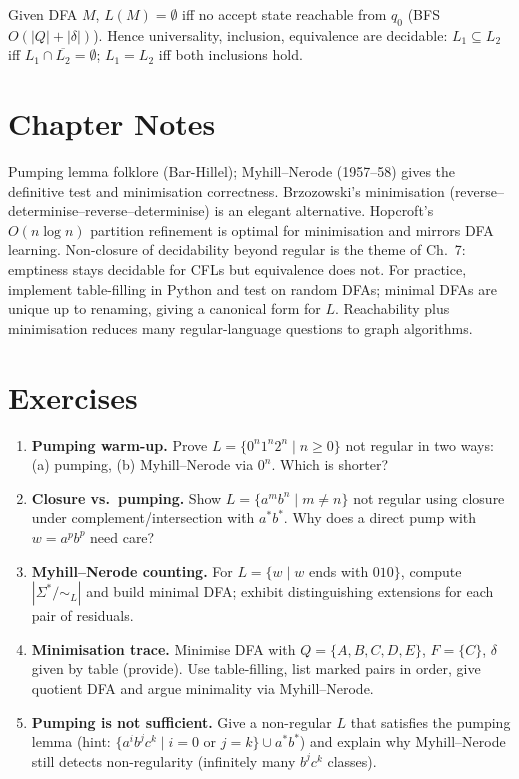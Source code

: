 \begin{theorem}
Given DFA $M$, $L(M)=\emptyset$ iff no accept state reachable from $q_0$ (BFS $O(|Q|+|\delta|)$). Hence universality, inclusion, equivalence are decidable: $L_1\subseteq L_2$ iff $L_1\cap\overline{L_2}=\emptyset$; $L_1=L_2$ iff both inclusions hold.
\end{theorem}

\section{Chapter Notes}
Pumping lemma folklore (Bar-Hillel); Myhill--Nerode (1957--58) gives the definitive test and minimisation correctness. Brzozowski's minimisation (reverse--determinise--reverse--determinise) is an elegant alternative.
Hopcroft's $O(n\log n)$ partition refinement is optimal for minimisation and mirrors DFA learning.
Non-closure of decidability beyond regular is the theme of Ch.~7: emptiness stays decidable for CFLs but equivalence does not.
For practice, implement table-filling in Python and test on random DFAs; minimal DFAs are unique up to renaming, giving a canonical form for $L$.
Reachability plus minimisation reduces many regular-language questions to graph algorithms.

\section{Exercises}
\label{sec:ch03-exercises}
\begin{enumerate}[label=E3.\arabic*, leftmargin=*, itemsep=0.8em]
\item \textbf{Pumping warm-up.} Prove $L=\{0^n1^n2^n\mid n\ge0\}$ not regular in two ways: (a) pumping, (b) Myhill--Nerode via $0^n$. Which is shorter?
\item \textbf{Closure vs.\ pumping.} Show $L=\{a^mb^n\mid m\neq n\}$ not regular using closure under complement/intersection with $a^*b^*$. Why does a direct pump with $w=a^pb^p$ need care?
\item \textbf{Myhill--Nerode counting.} For $L=\{w\mid w$ ends with $010\}$, compute $|\Sigma^*/\!\sim_L|$ and build minimal DFA; exhibit distinguishing extensions for each pair of residuals.
\item \textbf{Minimisation trace.} Minimise DFA with $Q=\{A,B,C,D,E\}$, $F=\{C\}$, $\delta$ given by table (provide). Use table-filling, list marked pairs in order, give quotient DFA and argue minimality via Myhill--Nerode.
\item \textbf{Pumping is not sufficient.} Give a non-regular $L$ that satisfies the pumping lemma (hint: $\{a^ib^jc^k\mid i=0\text{ or }j=k\}\cup a^*b^*$) and explain why Myhill--Nerode still detects non-regularity (infinitely many $b^jc^k$ classes).
\end{enumerate}
